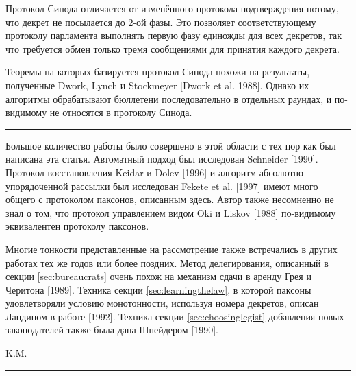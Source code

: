 \documentclass[12pt, a4paper]{article} %
\begin{document}
Протокол Синода отличается от изменённого протокола подтверждения потому, что декрет не посылается до 2-ой фазы. Это позволяет соответствующему протоколу парламента выполнять первую фазу единожды для всех декретов, так что требуется обмен только тремя сообщениями для принятия каждого декрета. 

Теоремы на которых базируется протокол Синода похожи на результаты, полученные Dwork, Lynch и Stockmeyer [Dwork et al. 1988]. Однако их алгоритмы обрабатывают бюллетени последовательно в отдельных раундах, и по-видимому не относятся в протоколу Синода.

\noindent\rule{\textwidth}{0.4pt}
{\color{gray}
Большое количество работы было совершено в этой области с тех пор как был написана эта статья. Автоматный подход был исследован Schneider [1990]. Протокол восстановления Keidar и Dolev [1996] и алгоритм абсолютно-упорядоченной рассылки был исследован Fekete et al. [1997] имеют много общего с протоколом паксонов, описанным здесь. Автор также несомненно не знал о том, что протокол управлением видом Oki и Liskov [1988] по-видимому эквивалентен протоколу паксонов.

Многие тонкости представленные на рассмотрение также встречались в других работах тех же годов или более поздних. Метод делегирования, описанный в секции \ref{sec:bureaucrats} очень похож на механизм сдачи в аренду Грея и Черитона [1989].  Техника секции \ref{sec:learningthelaw}, в которой паксоны удовлетворяли условию монотонности, используя номера декретов, описан Ландином в работе [1992].  Техника секции \ref{sec:choosinglegist} добавления новых законодателей также была дана Шнейдером [1990].\\
\begin{flushright}
    K.M.
\end{flushright}
}
\noindent\rule{\textwidth}{0.4pt}
\end{document}
